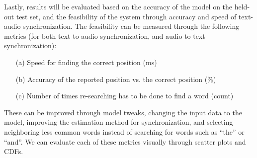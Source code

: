 \documentclass{article}
\begin{document}
Lastly, results will be evaluated based on the accuracy of the model on the held-out test set, and the feasibility of the system through accuracy and speed of text-audio synchronization. The feasibility can be measured through the following metrics (for both text to audio synchronization, and audio to text synchronization):

\begin{enumerate}
  \item[(a)] Speed for finding the correct position (ms)
  \item[(b)] Accuracy of the reported position vs. the correct position (\%)
  \item[(c)] Number of times re-searching has to be done to find a word (count)
\end{enumerate}

These can be improved through model tweaks, changing the input data to the model, improving the estimation method for synchronization, and selecting neighboring less common words instead of searching for words such as ``the'' or ``and''. We can evaluate each of these metrics visually through scatter plots and CDFs.



\end{document}
